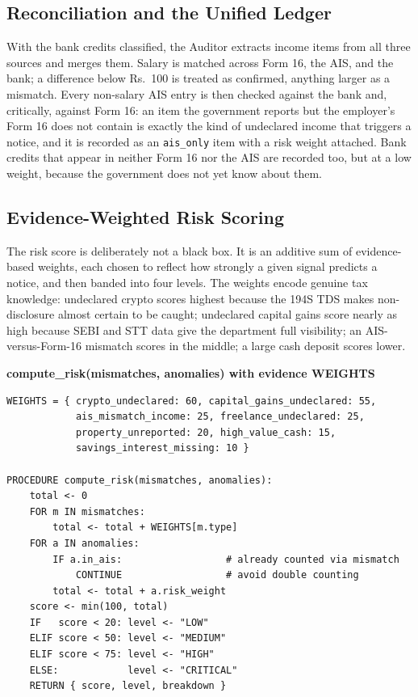 \documentclass[12pt, a4paper, oneside]{report}
\newcommand{\algname}[1]{\par\vspace{0.6em}\noindent\textbf{\ttfamily #1}\nopagebreak}
\begin{document}
\subsection{Reconciliation and the Unified Ledger}
With the bank credits classified, the Auditor extracts income items from all
three sources and merges them. Salary is matched across Form 16, the AIS, and
the bank; a difference below Rs.~100 is treated as confirmed, anything larger as
a mismatch. Every non-salary AIS entry is then checked against the bank and,
critically, against Form 16: an item the government reports but the employer's
Form 16 does not contain is exactly the kind of undeclared income that triggers
a notice, and it is recorded as an \texttt{ais\_only} item with a risk weight
attached. Bank credits that appear in neither Form 16 nor the AIS are recorded
too, but at a low weight, because the government does not yet know about them.

\subsection{Evidence-Weighted Risk Scoring}
The risk score is deliberately not a black box. It is an additive sum of
evidence-based weights, each chosen to reflect how strongly a given signal
predicts a notice, and then banded into four levels. The weights encode genuine
tax knowledge: undeclared crypto scores highest because the 194S TDS makes
non-disclosure almost certain to be caught; undeclared capital gains score
nearly as high because SEBI and STT data give the department full visibility; an
AIS-versus-Form-16 mismatch scores in the middle; a large cash deposit scores
lower.

\algname{compute\_risk(mismatches, anomalies) \quad with evidence WEIGHTS}
\begin{lstlisting}[style=pseudo]
WEIGHTS = { crypto_undeclared: 60, capital_gains_undeclared: 55,
            ais_mismatch_income: 25, freelance_undeclared: 25,
            property_unreported: 20, high_value_cash: 15,
            savings_interest_missing: 10 }

PROCEDURE compute_risk(mismatches, anomalies):
    total <- 0
    FOR m IN mismatches:
        total <- total + WEIGHTS[m.type]
    FOR a IN anomalies:
        IF a.in_ais:                  # already counted via mismatch
            CONTINUE                  # avoid double counting
        total <- total + a.risk_weight
    score <- min(100, total)
    IF   score < 20: level <- "LOW"
    ELIF score < 50: level <- "MEDIUM"
    ELIF score < 75: level <- "HIGH"
    ELSE:            level <- "CRITICAL"
    RETURN { score, level, breakdown }
\end{lstlisting}
\end{document}
